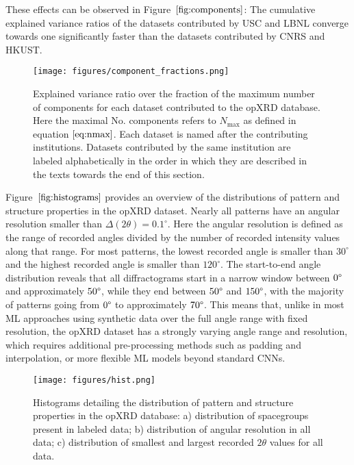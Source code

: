 These effects can be observed in Figure~$\eqref{fig:components}$: The cumulative explained variance ratios of the datasets contributed by USC and LBNL converge towards one significantly faster than the datasets contributed by CNRS and HKUST. \\

\begin{figure}[!htb]
    \centering
    \texttt{[image: figures/component\_fractions.png]}
    \caption{Explained variance ratio over the fraction of the maximum number of components for each dataset contributed to the opXRD database. Here the maximal No. components refers to $N_{\text{max}}$ as defined in equation $\eqref{eq:nmax}$. Each dataset is named after the contributing institutions. Datasets contributed by the same institution are labeled alphabetically in the order in which they are described in the texts towards the end of this section.}
    \label{fig:components}
\end{figure}



Figure~$\eqref{fig:histograms}$ provides an overview of the distributions of pattern and structure properties in the opXRD dataset. Nearly all patterns have an angular resolution smaller than $\Delta(2\theta) = 0.1 ^\circ$. Here the angular resolution is defined as the range of recorded angles divided by the number of recorded intensity values along that range. For most patterns, the lowest recorded angle is smaller than $30 ^\circ$ and the highest recorded angle is smaller than $120 ^\circ$. The start-to-end angle distribution reveals that all diffractograms start in a narrow window between $0\degree$ and approximately $50\degree$, while they end between $50\degree$ and $150\degree$, with the majority of patterns going from $0\degree$ to approximately $70\degree$. This means that, unlike in most ML approaches using synthetic data over the full angle range with fixed resolution, the opXRD dataset has a strongly varying angle range and resolution, which requires additional pre-processing methods such as padding and interpolation, or more flexible ML models beyond standard CNNs.

\begin{figure}[!htb]
    \centering
    \texttt{[image: figures/hist.png]}
    \caption{Histograms detailing the distribution of pattern and structure properties in the opXRD database: a) distribution of spacegroups present in labeled data; b) distribution of angular resolution in all data; c) distribution of smallest and largest recorded $2\theta$ values for all data.}
    \label{fig:histograms}
\end{figure}

